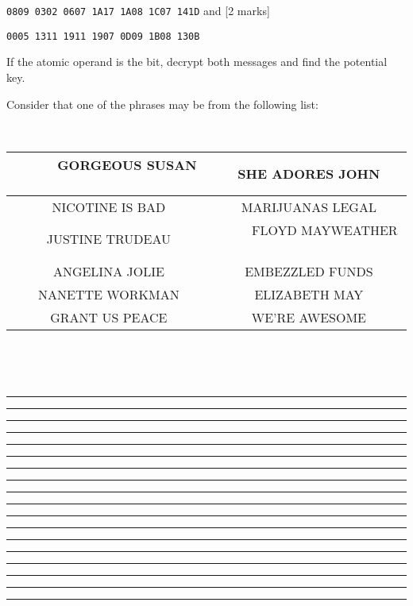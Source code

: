 \documentclass[12pt,emtex]{article}
\begin{document}
\begin{enumerate}
\texttt{0809 0302 0607 1A17 1A08 1C07 141D}
	and
	 	 \hfill [2 marks]
	
\texttt{0005 1311 1911 1907 0D09 1B08 130B}

 
  If the atomic operand is the bit, decrypt both messages and find the potential key.

Consider that one of the phrases may be from the following list: 

\

{\footnotesize \begin{center}
\begin{tabular}{|c|c|}  \hline
\ \ \ \ \ GORGEOUS SUSAN \ \ \ \ \ 
&
SHE ADORES JOHN
\\ \hline
NICOTINE IS BAD
&
MARIJUANAS LEGAL
\\ \hline
JUSTINE TRUDEAU
&
\ \ \ \ \ FLOYD MAYWEATHER \ \ \ \ \ 
\\ \hline
ANGELINA JOLIE
&
EMBEZZLED FUNDS \\ \hline
NANETTE WORKMAN
&
ELIZABETH MAY
\\ \hline
GRANT US PEACE
&
WE'RE AWESOME \\  \hline
\end{tabular}
\end{center}
}


\


\

\hrule \vspace{8mm}   \hrule \vspace{8mm}    
\hrule \vspace{8mm}   \hrule \vspace{8mm}
\hrule \vspace{8mm}   \hrule \vspace{8mm}    
\hrule \vspace{8mm}   \hrule \vspace{8mm}
\hrule \vspace{8mm}   \hrule \vspace{8mm}    
\hrule \vspace{8mm}   \hrule \vspace{8mm}
\hrule \vspace{8mm}   \hrule \vspace{8mm}
\hrule \vspace{8mm}   \hrule \vspace{8mm}    
\hrule \vspace{8mm}   \hrule \vspace{8mm}





\end{enumerate}
\end{document}
